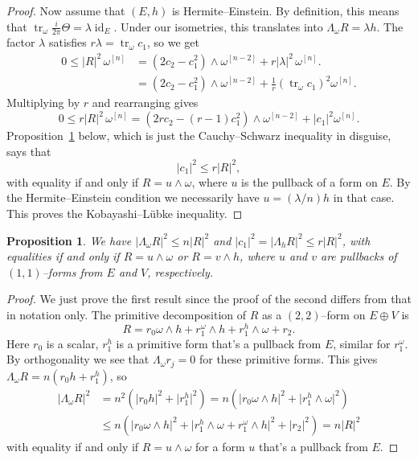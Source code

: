 \documentclass[11pt,a4paper]{amsart}
\def\^#1{^{[#1]}}
\DeclareMathOperator{\tr}{tr}
\DeclareMathOperator{\id}{id}
\def\curv{\frac{i}{2\pi} \Theta}
\newtheorem{prop}[theo]{Proposition}
\theoremstyle{definition}
\theoremstyle{remark}
\numberwithin{equation}{section}
\begin{document}
\begin{proof}
Now assume that $(E,h)$ is Hermite--Einstein. By definition, this means
that $\tr_\omega \curv = \lambda \id_{E}$. Under our isometries, this
translates into $\Lambda_\omega R = \lambda h$. The factor $\lambda$
satisfies $r \lambda = \tr_\omega c_1$, so we get
\begin{align*}
    0 \leq 
    \lvert R \rvert^2 \, \omega\^{n}
    &= (2 c_2 - c_1^2) \wedge \omega\^{n-2}
    + r |\lambda|^2 \, \omega\^{n}.
    \\
    &= (2 c_2 - c_1^2) \wedge \omega\^{n-2}
    + \tfrac 1r (\tr_\omega c_1)^2 \omega\^{n}.
\end{align*}
Multiplying by $r$ and rearranging gives 
$$
0 \leq
r \lvert R \rvert^2 \, \omega\^{n}
= (2r c_2 - (r-1)c_1^2) \wedge \omega\^{n-2}
+ \lvert c_1 \rvert^2 \omega\^{n}.
$$
Proposition~\ref{prop:CS} below, which is just the Cauchy--Schwarz
inequality in disguise, says that
$$
\lvert c_1 \rvert^2 \leq r \lvert R \rvert^2,
$$
with equality if and only if $R = u \wedge \omega$, where $u$ is the
pullback of a form on $E$. By the Hermite--Einstein condition we
necessarily have $u = (\lambda/n) h$ in that case. This proves the
Kobayashi--L\"{u}bke inequality.
\end{proof}



\begin{prop}
\label{prop:CS}
We have $\lvert \Lambda_\omega R\rvert^2 \leq n \lvert R \rvert^2$ and
$\lvert c_1 \rvert^2 = \lvert \Lambda_h R\rvert^2 \leq r \lvert R
\rvert^2$, with equalities if and only if $R = u \wedge \omega$ or $R = v
\wedge h$, where $u$ and $v$ are pullbacks of $(1,1)$--forms from $E$ and
$V$, respectively. 
\end{prop}

\begin{proof}
    We just prove the first result since the proof of the second
differs from that in notation only.  The primitive decomposition of
$R$ as a $(2,2)$--form on $E \oplus V$ is 
$$
R = r_0 \omega \wedge h + r_1^\omega \wedge h + r_1^h \wedge \omega
+ r_2.
$$
Here $r_0$ is a scalar, $r_1^h$ is a primitive form that's a pullback from
$E$, similar for $r_1^\omega$. By orthogonality we see that $\Lambda_\omega
r_j = 0$ for these primitive forms. This gives 
$\Lambda_\omega R = n (r_0 h + r_1^h)$,
so
\begin{align*}
\lvert \Lambda_\omega R \rvert^2 
&= n^2 (\lvert r_0 h\rvert^2 +\lvert r_1^h\rvert^2)
= n (\lvert r_0 \omega \wedge h\rvert^2 
+ \lvert r_1^h \wedge \omega \rvert^2)
\\
&\leq
n(\lvert r_0 \omega \wedge h \rvert^2 
+ \lvert r_1^h \wedge \omega 
+ r_1^\omega \wedge h \rvert^2 
+ \lvert r_2 \rvert^2 )
= n \lvert R \rvert^2
\end{align*}
with equality if and only if $R = u \wedge \omega$ for a form $u$ that's a pullback from $E$.
\end{proof}
\end{document}
